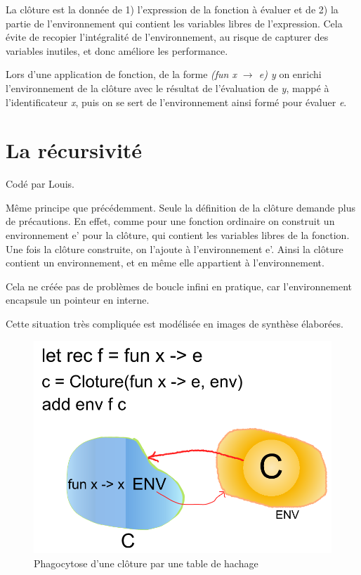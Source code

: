 \documentclass[a4paper,10pt]{report}
\begin{document}
La clôture est la donnée de 1) l'expression de la fonction à évaluer et de 2) la partie de l'environnement qui contient les variables libres de l'expression. Cela évite de recopier l'intégralité de l'environnement, au risque de capturer des variables inutiles, et donc améliore les performance.  
  
Lors d'une application de fonction, de la forme \textit{(fun x $\to$ e) y} on enrichi l'environnement de la clôture avec le résultat de l'évaluation de \textit{y}, mappé à l'identificateur \textit{x}, puis on se sert de l'environnement ainsi formé pour évaluer \textit{e}.  
  
\section{La récursivité}  
Codé par Louis.

Même principe que précédemment. Seule la définition de la clôture demande plus de précautions.  
En effet, comme pour une fonction ordinaire on construit un environnement e' pour la clôture, qui contient les variables libres de la fonction. Une fois la clôture construite, on l'ajoute à l'environnement e'. Ainsi la clôture contient un environnement, et en même elle appartient à l'environnement.   
  
Cela ne créée pas de problèmes de boucle infini en pratique, car l'environnement encapsule un pointeur en interne.  
  
Cette situation très compliquée est modélisée en images de synthèse élaborées.  
  
\begin{figure}
\center
\includegraphics[scale=0.3]{Drawing.png} 
\caption {Phagocytose d'une clôture par une table de hachage}
\end{figure}
\end{document}
